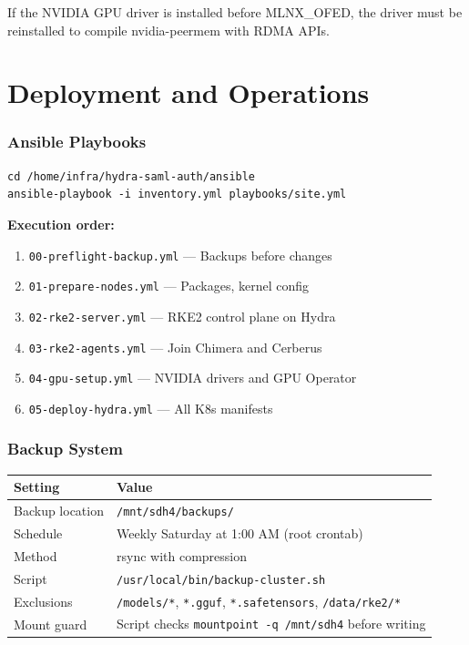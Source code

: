 \documentclass[11pt,a4paper]{article}
\begin{document}
\begin{warningbox}
If the NVIDIA GPU driver is installed before MLNX\_OFED, the driver must be reinstalled to compile nvidia-peermem with RDMA APIs.
\end{warningbox}

\newpage
\part{Deployment and Operations}

\section{Ansible Playbooks}

\begin{lstlisting}[style=bash]
cd /home/infra/hydra-saml-auth/ansible
ansible-playbook -i inventory.yml playbooks/site.yml
\end{lstlisting}

\textbf{Execution order:}
\begin{enumerate}[nosep]
    \item \texttt{00-preflight-backup.yml} --- Backups before changes
    \item \texttt{01-prepare-nodes.yml} --- Packages, kernel config
    \item \texttt{02-rke2-server.yml} --- RKE2 control plane on Hydra
    \item \texttt{03-rke2-agents.yml} --- Join Chimera and Cerberus
    \item \texttt{04-gpu-setup.yml} --- NVIDIA drivers and GPU Operator
    \item \texttt{05-deploy-hydra.yml} --- All K8s manifests
\end{enumerate}

\section{Backup System}

\begin{table}[H]
\centering
\begin{tabular}{ll}
\toprule
\textbf{Setting} & \textbf{Value} \\
\midrule
Backup location & \texttt{/mnt/sdh4/backups/} \\
Schedule & Weekly Saturday at 1:00 AM (root crontab) \\
Method & rsync with compression \\
Script & \texttt{/usr/local/bin/backup-cluster.sh} \\
Exclusions & \texttt{/models/*}, \texttt{*.gguf}, \texttt{*.safetensors}, \texttt{/data/rke2/*} \\
Mount guard & Script checks \texttt{mountpoint -q /mnt/sdh4} before writing \\
\bottomrule
\end{tabular}
\end{table}
\end{document}
